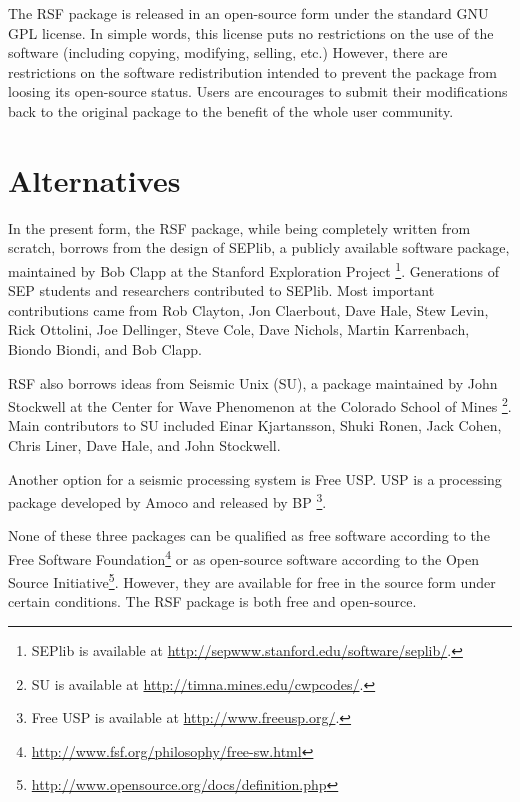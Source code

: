 The RSF package is released in an open-source form under the standard GNU GPL
license. In simple words, this license puts no restrictions on the use of the
software (including copying, modifying, selling, etc.) However, there are
restrictions on the software redistribution intended to prevent the package
from loosing its open-source status. Users are encourages to submit their
modifications back to the original package to the benefit of the whole user
community.

\section{Alternatives} 

In the present form, the RSF package, while being completely written from
scratch, borrows from the design of SEPlib, a publicly available software
package, maintained by Bob Clapp at the Stanford Exploration Project
\cite[]{Claerbout.sep.70.413,Dellinger.sep.73.461,Nichols.sep.82.257,Biondi.sep.92.343,Clapp.sep.102.bob1}\footnote{SEPlib
  is available at \url{http://sepwww.stanford.edu/software/seplib/}.}.
Generations of SEP students and researchers contributed to SEPlib. Most
important contributions came from Rob Clayton, Jon Claerbout, Dave Hale, Stew
Levin, Rick Ottolini, Joe Dellinger, Steve Cole, Dave Nichols, Martin
Karrenbach, Biondo Biondi, and Bob Clapp.

RSF also borrows ideas from Seismic Unix (SU), a package maintained by John
Stockwell at the Center for Wave Phenomenon at the Colorado School of Mines
\cite[]{TLE16-07-10451049,su}\footnote{SU is available at
  \url{http://timna.mines.edu/cwpcodes/}.}. Main contributors to SU
included Einar Kjartansson, Shuki Ronen, Jack Cohen, Chris Liner, Dave Hale,
and John Stockwell.

Another option for a seismic processing system is Free USP. USP is a
processing package developed by Amoco and released by BP \footnote{Free USP is
  available at \url{http://www.freeusp.org/}.}.

None of these three packages can be qualified as free software according to
the Free Software
Foundation\footnote{\url{http://www.fsf.org/philosophy/free-sw.html}} or as
open-source software according to the Open Source
Initiative\footnote{\url{http://www.opensource.org/docs/definition.php}}.
However, they are available for free in the source form under certain
conditions. The RSF package is both free and open-source. 




%


